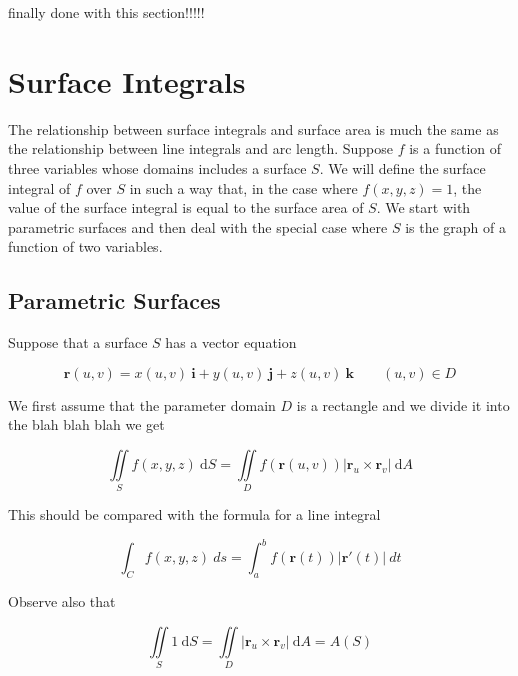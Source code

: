 \documentclass{article}
\begin{document}
finally done with this section!!!!!



\newpage
\section{Surface Integrals}

The relationship between surface integrals and surface area is much the same as the relationship between line integrals and arc length. Suppose $f$ is a function of three variables whose domains includes a surface $S$. We will define the surface integral of $f$ over $S$ in such a way that, in the case where $f(x,y,z) = 1$, the value of the surface integral is equal to the surface area of $S$. We start with parametric surfaces and then deal with the special case where $S$ is the graph of a function of two variables.

\subsection{Parametric Surfaces}

Suppose that a surface $S$ has a vector equation 

\begin{equation*}
    \mathbf{r}(u,v) = x(u,v) \ \mathbf{i} + y(u,v) \ \mathbf{j} + z(u,v) \ \mathbf{k} \qquad (u,v) \in D
\end{equation*}

We first assume that the parameter domain $D$ is a rectangle and we divide it into the blah blah blah we get 

\begin{equation*}
    \iint\limits_{S} f(x,y,z) \ \mathrm{d}S = \iint\limits_{D} f(\mathbf{r}(u,v)) \rvert \mathbf{r}_u \times \mathbf{r}_v   \rvert \ \mathrm{d}A
\end{equation*}

This should be compared with the formula for a line integral 

\begin{equation*}
    \int_C f(x,y,z) \ ds = \int_{a}^{b} f(\mathbf{r}(t)) \rvert \mathbf{r}'(t) \rvert \ dt
\end{equation*}

Observe also that 

\begin{equation*}
    \iint\limits_{S} 1 \ \mathrm{d}S = \iint\limits_{D} \rvert \mathbf{r}_u  \times \mathbf{r}_v  \rvert \ \mathrm{d}A = A(S)
\end{equation*}
\end{document}
